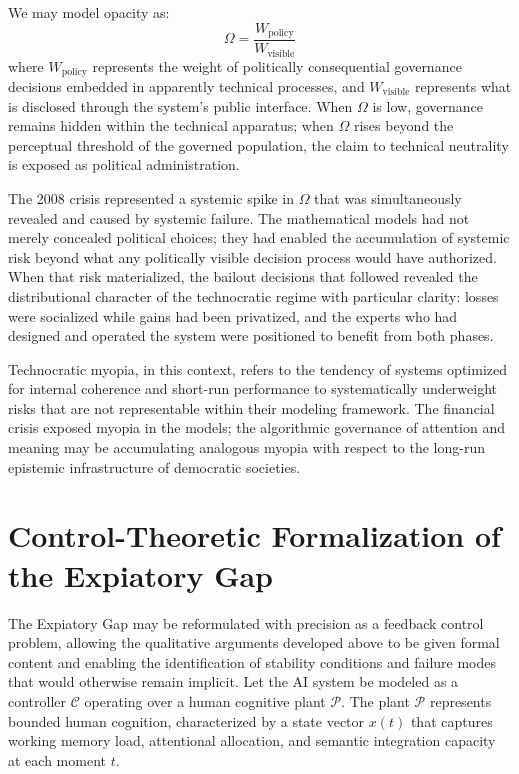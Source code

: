 \documentclass[12pt]{article}
\begin{document}
We may model opacity as:
\[
\Omega = \frac{W_{\text{policy}}}{W_{\text{visible}}}
\]
where $W_{\text{policy}}$ represents the weight of politically consequential governance decisions embedded in apparently technical processes, and $W_{\text{visible}}$ represents what is disclosed through the system's public interface. When $\Omega$ is low, governance remains hidden within the technical apparatus; when $\Omega$ rises beyond the perceptual threshold of the governed population, the claim to technical neutrality is exposed as political administration.

The 2008 crisis represented a systemic spike in $\Omega$ that was simultaneously revealed and caused by systemic failure. The mathematical models had not merely concealed political choices; they had enabled the accumulation of systemic risk beyond what any politically visible decision process would have authorized. When that risk materialized, the bailout decisions that followed revealed the distributional character of the technocratic regime with particular clarity: losses were socialized while gains had been privatized, and the experts who had designed and operated the system were positioned to benefit from both phases.

Technocratic myopia, in this context, refers to the tendency of systems optimized for internal coherence and short-run performance to systematically underweight risks that are not representable within their modeling framework. The financial crisis exposed myopia in the models; the algorithmic governance of attention and meaning may be accumulating analogous myopia with respect to the long-run epistemic infrastructure of democratic societies.

\section{Control-Theoretic Formalization of the Expiatory Gap}

The Expiatory Gap may be reformulated with precision as a feedback control problem, allowing the qualitative arguments developed above to be given formal content and enabling the identification of stability conditions and failure modes that would otherwise remain implicit. Let the AI system be modeled as a controller $\mathcal{C}$ operating over a human cognitive plant $\mathcal{P}$. The plant $\mathcal{P}$ represents bounded human cognition, characterized by a state vector $x(t)$ that captures working memory load, attentional allocation, and semantic integration capacity at each moment $t$.
\end{document}

